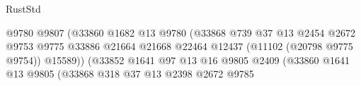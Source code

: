 \begin{lexlean}{RustStd}
\begin{coremodule}
                                                          @9780
                                                          @9807
                                                          (@33860
                                                            @1682
                                                            @13
                                                            @9780
                                                            (@33868
                                                              @739
                                                              @37
                                                              @13
                                                              @2454
                                                              @2672
                                                              @9753
                                                              @9775
                                                              @33886
                                                              @21664
                                                              @21668
                                                              @22464
                                                              @12437
                                                              (@11102 (@20798 @9775 @9754))
                                                              @15589))
                                                          (@33852
                                                            @1641
                                                            @97
                                                            @13
                                                            @16
                                                            @9805
                                                            @2409
                                                            (@33860
                                                              @1641
                                                              @13
                                                              @9805
                                                              (@33868
                                                                @318
                                                                @37
                                                                @13
                                                                @2398
                                                                @2672
                                                                @9785

\end{coremodule}
\end{lexlean}
